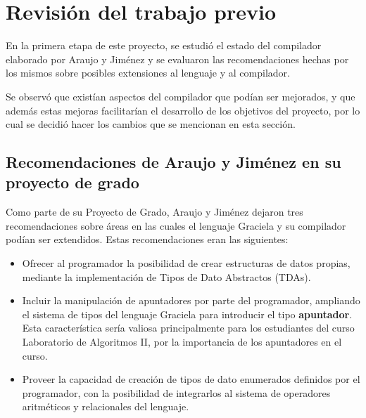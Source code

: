 \setcounter{section}{-1}
\section{Revisión del trabajo previo}

En la primera etapa de este proyecto, se estudió el estado del compilador
elaborado por Araujo y Jiménez y se evaluaron las recomendaciones hechas por los
mismos sobre posibles extensiones al lenguaje y al compilador.

Se observó que existían aspectos del compilador que podían ser mejorados, y que
además estas mejoras facilitarían el desarrollo de los objetivos del proyecto,
por lo cual se decidió hacer los cambios que se mencionan en esta sección.

\subsection{Recomendaciones de Araujo y Jiménez en su proyecto de grado}

Como parte de su Proyecto de Grado, Araujo y Jiménez dejaron tres
recomendaciones sobre áreas en las cuales el lenguaje Graciela y su compilador
podían ser extendidos. Estas recomendaciones eran las siguientes:

\begin{itemize}

  \item Ofrecer al programador la posibilidad de crear estructuras de datos
  propias, mediante la implementación de Tipos de Dato Abstractos (TDAs).

  \item Incluir la manipulación de apuntadores por parte del programador,
  ampliando el sistema de tipos del lenguaje Graciela para introducir el tipo
  \textbf{apuntador}. Esta característica sería valiosa principalmente para los
  estudiantes del curso Laboratorio de Algoritmos II, por la importancia de los
  apuntadores en el curso.

  \item Proveer la capacidad de creación de tipos de dato enumerados definidos
  por el programador, con la posibilidad de integrarlos al sistema de operadores
  aritméticos y relacionales del lenguaje.

\end{itemize}

